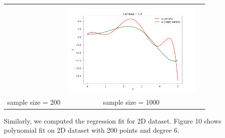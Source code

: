 \documentclass[11pt]{article}
\begin{document}
\begin{center}
\begin{tabular}{ccc}
  & \includegraphics[width=7cm]{regression/1d-ridge-ls-compare-7-7lnlam-0.0-fig.png}\\
  sample size = 200 & sample size = 1000 \\
  \end{tabular}
\end{center}
  Similarly, we computed the regression fit for 2D dataset. Figure 10 shows polynomial fit on 2D dataset with 200 points and degree 6.
\end{document}
